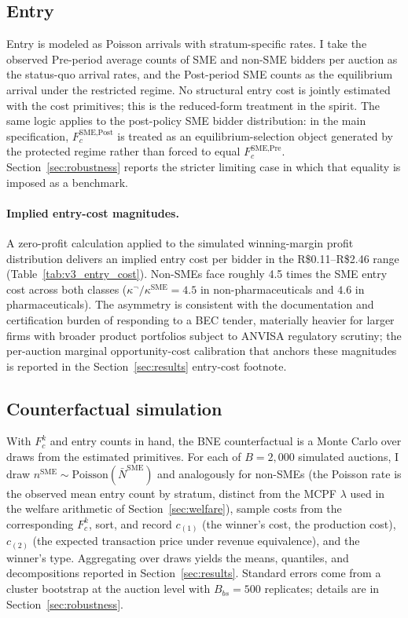 \subsection{Entry}

Entry is modeled as Poisson arrivals with stratum-specific rates. I take the observed Pre-period average counts of SME and non-SME bidders per auction as the status-quo arrival rates, and the Post-period SME counts as the equilibrium arrival under the restricted regime. No structural entry cost is jointly estimated with the cost primitives; this is the reduced-form treatment in the \citet{atheyseira2011} spirit. The same logic applies to the post-policy SME bidder distribution: in the main specification, $F_c^{\text{SME,Post}}$ is treated as an equilibrium-selection object generated by the protected regime rather than forced to equal $F_c^{\text{SME,Pre}}$. Section~\ref{sec:robustness} reports the stricter limiting case in which that equality is imposed as a benchmark.

\paragraph{Implied entry-cost magnitudes.} A zero-profit calculation applied to the simulated winning-margin profit distribution delivers an implied entry cost per bidder in the R\$0.11--R\$2.46 range (Table~\ref{tab:v3_entry_cost}). Non-SMEs face roughly 4.5 times the SME entry cost across both classes ($\kappa^{\neg}/\kappa^{\text{SME}} = 4.5$ in non-pharmaceuticals and $4.6$ in pharmaceuticals). The asymmetry is consistent with the documentation and certification burden of responding to a BEC tender, materially heavier for larger firms with broader product portfolios subject to ANVISA regulatory scrutiny; the per-auction marginal opportunity-cost calibration that anchors these magnitudes is reported in the Section~\ref{sec:results} entry-cost footnote.

\subsection{Counterfactual simulation}

With $F_c^k$ and entry counts in hand, the BNE counterfactual is a Monte Carlo over draws from the estimated primitives. For each of $B = 2{,}000$ simulated auctions, I draw $n^{\text{SME}} \sim \mathrm{Poisson}(\bar N^{\text{SME}})$ and analogously for non-SMEs (the Poisson rate is the observed mean entry count by stratum, distinct from the MCPF $\lambda$ used in the welfare arithmetic of Section~\ref{sec:welfare}), sample costs from the corresponding $F_c^k$, sort, and record $c_{(1)}$ (the winner's cost, the production cost), $c_{(2)}$ (the expected transaction price under revenue equivalence), and the winner's type. Aggregating over draws yields the means, quantiles, and decompositions reported in Section~\ref{sec:results}. Standard errors come from a cluster bootstrap at the auction level with $B_{bs} = 500$ replicates; details are in Section~\ref{sec:robustness}.
